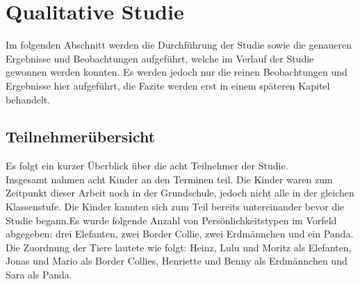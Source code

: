 \chapter{Qualitative Studie}
	Im folgenden Abschnitt werden die Durchführung der Studie sowie die genaueren Ergebnisse und Beobachtungen aufgeführt, welche im Verlauf der Studie gewonnen werden konnten. Es werden jedoch nur die reinen Beobachtungen und Ergebnisse hier aufgeführt, die Fazite werden erst in einem späteren Kapitel behandelt.
\section{Teilnehmerübersicht}
	Es folgt ein kurzer Überblick über die acht Teilnehmer der Studie.\\
	Insgesamt nahmen acht Kinder an den Terminen teil. Die Kinder waren zum Zeitpunkt dieser Arbeit noch in der Grundschule, jedoch nicht alle in der gleichen Klassenstufe. Die Kinder kannten sich zum Teil bereits untereinander bevor die Studie begann.Es wurde folgende Anzahl von Persönlichkeitstypen im Vorfeld abgegeben: drei Elefanten, zwei Border Collie, zwei Erdmännchen und ein Panda. Die Zuordnung der Tiere lautete wie folgt: Heinz, Lulu und Moritz als Elefanten, Jonas und Mario als Border Collies, Henriette und Benny als Erdmännchen und Sara als Panda.\\
	
